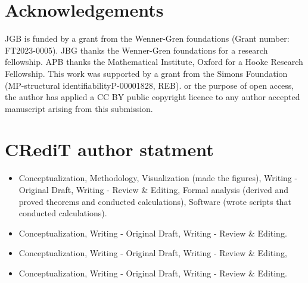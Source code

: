 \documentclass[12pt]{article}
\begin{document}

\section*{Acknowledgements}
JGB is funded by a grant from the Wenner-Gren foundations (Grant number: FT2023-0005). JBG thanks the Wenner-Gren foundations for a research fellowship. APB thanks the Mathematical Institute, Oxford for a Hooke Research Fellowship. This work was supported by a grant from the Simons Foundation (MP-structural identifiabilityP-00001828, REB). or the purpose of open access, the author has applied a
CC BY public copyright licence to any author accepted manuscript arising from this submission.

\section*{CRediT author statment}
\begin{itemize}
\item[\textbf{JGB}] Conceptualization, Methodology, Visualization (made the figures), Writing - Original Draft, Writing - Review \& Editing, Formal analysis (derived and proved theorems and conducted calculations), Software (wrote scripts that conducted calculations). 
\item[\textbf{APB}] Conceptualization, Writing - Original Draft, Writing - Review \& Editing.
\item[\textbf{FO}] Conceptualization, Writing - Original Draft, Writing - Review \& Editing,
\item[\textbf{REB}] Conceptualization, Writing - Original Draft, Writing - Review \& Editing.
\end{itemize}





\clearpage
\appendix  %

\renewcommand{\thesection}{\Alph{section}}

\end{document}
